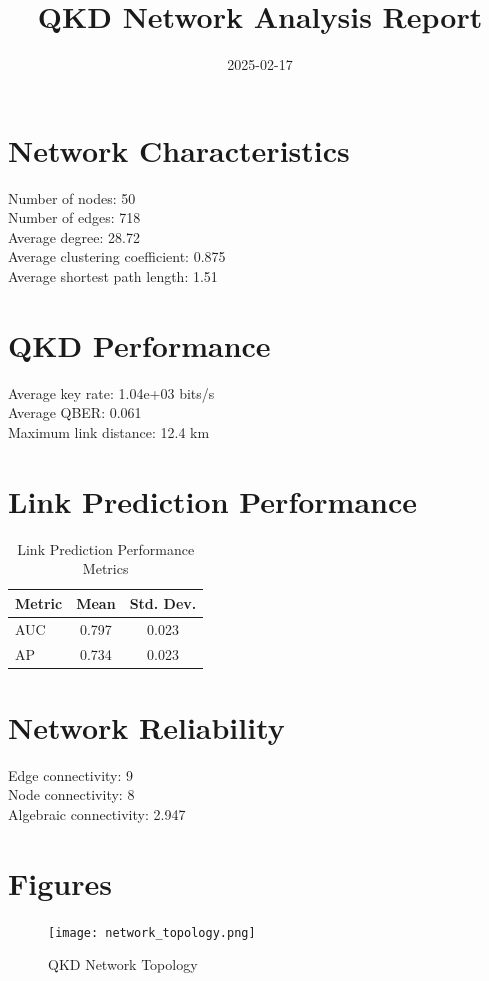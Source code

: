 \documentclass{article}
\title{QKD Network Analysis Report}
\date{2025-02-17}
\begin{document}
    \maketitle

    \section{Network Characteristics}
    Number of nodes: 50 \\
    Number of edges: 718 \\
    Average degree: 28.72 \\
    Average clustering coefficient: 0.875 \\
    Average shortest path length: 1.51

    \section{QKD Performance}
    Average key rate: 1.04e+03 bits/s \\
    Average QBER: 0.061 \\
    Maximum link distance: 12.4 km

    \section{Link Prediction Performance}
    \begin{table}[H]
    \centering
    \begin{tabular}{lcc}
    \toprule
    Metric & Mean & Std. Dev. \\
    \midrule
    AUC & 0.797 &
        0.023 \\
    AP & 0.734 &
        0.023 \\
    \bottomrule
    \end{tabular}
    \caption{Link Prediction Performance Metrics}
    \end{table}

    \section{Network Reliability}
    Edge connectivity: 9 \\
    Node connectivity: 8 \\
    Algebraic connectivity: 2.947

    \section{Figures}
    \begin{figure}[H]
    \centering
    \texttt{[image: network\_topology.png]}
    \caption{QKD Network Topology}
    \end{figure}
\end{document}
